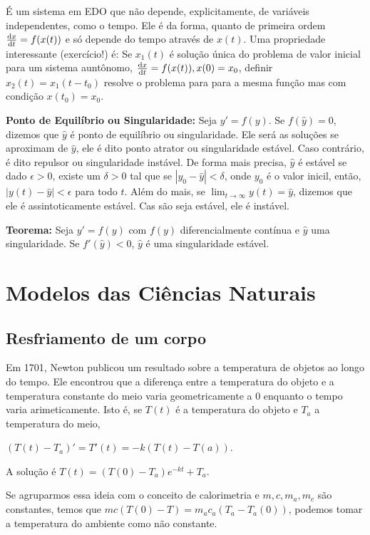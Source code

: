 \documentclass[12pt]{article}
\begin{document}
É um sistema em EDO que não depende, explicitamente, de variáveis
independentes, como o tempo. Ele é da forma, quanto de primeira ordem
$\dv{x}{t} = f(x(t))$ e só depende do tempo através de $x(t)$. Uma propriedade
interessante (exercício!) é: Se $x_1(t)$ é solução única do problema de valor
inicial para um sistema auntônomo, $\dv{x}{t} = f(x(t)), x(0) = x_0$,
definir $x_2(t) = x_1(t - t_0)$ resolve o problema para para a mesma função
mas com condição $x(t_0) = x_0$. 

\textbf{Ponto de Equilíbrio ou Singularidade:} Seja $y' = f(y)$. Se
$f(\hat{y}) = 0$, dizemos que $\hat{y}$ é ponto de equilíbrio ou
singularidade. Ele será as soluções se aproximam de $\hat{y}$, ele é dito
ponto atrator ou singularidade estável. Caso contrário, é dito repulsor ou
singularidade instável. De forma mais precisa, $\hat{y}$ é estável se dado
$\epsilon > 0$, existe um $\delta > 0$ tal que se $|y_0 - \hat{y}| < \delta$,
onde $y_0$ é o valor inicil, então, $|y(t) - \hat{y}| < \epsilon$ para todo
$t$. Além do mais, se $\lim_{t \to \infty} y(t) = \hat{y}$, dizemos que ele é
assintoticamente estável. Cas são seja estável, ele é instável.  

\textbf{Teorema:} Seja $y' = f(y)$ com $f(y)$ diferencialmente contínua e
$\hat{y}$ uma singularidade. Se $f'(\hat{y}) < 0$, $\hat{y}$ é uma
singularidade estável. 

\section{Modelos das Ciências Naturais}

\subsection{Resfriamento de um corpo}

Em 1701, Newton publicou um resultado sobre a temperatura de objetos ao longo
do tempo. Ele encontrou que a diferença entre a temperatura do objeto e a
temperatura constante do meio varia geometricamente a 0 enquanto o tempo varia
arimeticamente. Isto é, se $T(t)$ é a temperatura do objeto e $T_a$ a
temperatura do meio, 

$(T(t) - T_a)' = T'(t) = -k(T(t) - T(a))$. 

A solução é $T(t) = (T(0) - T_a)e^{-kt} + T_a$. 

Se agruparmos essa ideia com o conceito de calorimetria e $m,c,m_a, m_c$
são constantes, temos que $mc(T(0) - T) = m_ac_a(T_a - T_a(0))$, podemos tomar
a temperatura do ambiente como não constante. 
\end{document}

